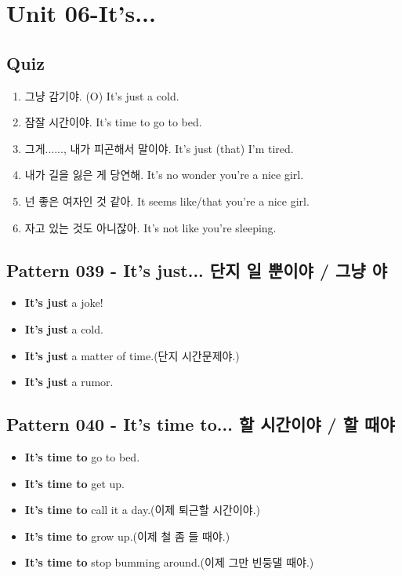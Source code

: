 \documentclass[11pt]{oblivoir}
\begin{document}
\section{Unit 06-It's...}
\subsection{Quiz}
\begin{enumerate}
  \color{black} \item 그냥 감기야. (O)
    \color{light-gray} It's just a cold.
  \color{black} \item 잠잘 시간이야.
    \color{light-gray} It's time to go to bed.
  \color{black} \item 그게......, 내가 피곤해서 말이야.
    \color{light-gray} It's just (that) I'm tired.
  \color{black} \item 내가 길을 잃은 게 당연해.
    \color{light-gray} It's no wonder you're a nice girl.
  \color{black} \item 넌 좋은 여자인 것 같아.
    \color{light-gray} It seems like/that you're a nice girl.
  \color{black} \item 자고 있는 것도 아니잖아.
    \color{light-gray} It's not like you're sleeping.
\end{enumerate}

\subsection{Pattern 039 - It's just... 단지 \texttildelow 일 뿐이야 / 그냥 \texttildelow 야}
\begin{itemize}
  \item \textbf{It's just} a joke!
  \item \textbf{It's just} a cold.
  \item \textbf{It's just} a matter of time.(단지 시간문제야.)
  \item \textbf{It's just} a rumor.
\end{itemize}

\subsection{Pattern 040 - It's time to... \texttildelow 할 시간이야 / \texttildelow 할 때야}
\begin{itemize}
  \item \textbf{It's time to} go to bed.
  \item \textbf{It's time to} get up.
  \item \textbf{It's time to} call it a day.(이제 퇴근할 시간이야.)
  \item \textbf{It's time to} grow up.(이제 철 좀 들 때야.)
  \item \textbf{It's time to} stop bumming around.(이제 그만 빈둥댈 때야.)
\end{itemize}
\end{document}
